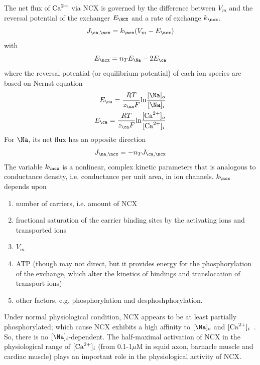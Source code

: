 The net flux of ${\text{Ca}^{2+}}$ via NCX is governed by the difference between
$V_m$ and the reversal potential of the exchanger $E_\NCX$ and a rate
of exchange $k_\ncx$.
\begin{equation}
  \label{eq:1461}
  J_{\ca,\ncx} = k_\ncx (V_m-E_\ncx)
\end{equation}
with
\begin{equation}
  \label{eq:1462}
  E_\ncx=n_TE_\Na-2E_\ca
\end{equation}
where the reversal potential (or equilibrium potential) of each ion
species are based on Nernst equation
\begin{equation}
  \label{eq:1463}
  \begin{split}
    E_\na = \frac{RT}{z_\na F}\ln\frac{[\Na]_o}{[\Na]_i}\\
    E_\ca = \frac{RT}{z_\ca F}\ln\frac{[\Ca]_o}{[\Ca]_i}\\
  \end{split}
\end{equation}
For $\Na$, its net flux has an opposite direction
\begin{equation}
  \label{eq:1464}
  J_{\na,\ncx} = -n_T J_{\ca,\ncx}
\end{equation}
The variable $k_\ncx$ is a nonlinear, complex kinetic parameters that
is analogous to conductance density, i.e. conductance per unit area,
in ion channels. $k_\ncx$ depends upon
\begin{enumerate}
\item number of carriers, i.e. amount of NCX
\item fractional saturation of the carrier binding sites by the
  activating ions and transported ions
\item $V_m$
\item ATP (though may not direct, but it provides energy for the
  phosphorylation of the exchange, which alter the kinetics of
  bindings and translocation of transport ions)
\item other factors, e.g. phosphorylation and desphoshphorylation. 
\end{enumerate}
Under normal physiological condition, NCX appears to be at least
partially phosphorylated; which cause NCX exhibits a high affinity to
$[\Na]_o$ and $[{\text{Ca}^{2+}}]_i$~\citep{blaustein1977,dipoli1987}. So, there is
no $[\Na]_i$-dependent. The half-maximal activation of NCX in the
physiological range of $[{\text{Ca}^{2+}}]_i$ (from 0.1-1$\mu$M in squid axon,
barnacle muscle and cardiac muscle) plays an important role in the
physiological activity of NCX.

